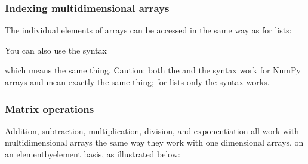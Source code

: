 \documentclass[letterpaper,10pt,english]{sphinxmanual}
\begin{document}
\subsubsection{Indexing multidimensional arrays}
\label{\detokenize{chap3/chap3_arrays:indexing-multidimensional-arrays}}
\sphinxAtStartPar
The individual elements of arrays can be accessed in the same way as for lists:

\begin{sphinxVerbatim}[commandchars=\\\{\}]
\PYG{p}{[}\PYG{p}{]}\PYG{p}{[}\PYG{p}{]}
\end{sphinxVerbatim}

\sphinxAtStartPar
You can also use the syntax

\begin{sphinxVerbatim}[commandchars=\\\{\}]
\PYG{p}{[}\PYG{p}{]}
\end{sphinxVerbatim}

\sphinxAtStartPar
which means the same thing.  Caution: both the  and the  syntax work for NumPy arrays and mean exactly the same thing; for lists only the  syntax works.


\subsubsection{Matrix operations}
\label{\detokenize{chap3/chap3_arrays:matrix-operations}}
\sphinxAtStartPar
Addition, subtraction, multiplication, division, and exponentiation all work with multidimensional arrays the same way they work with one dimensional arrays, on an element\sphinxhyphen{}by\sphinxhyphen{}element basis, as illustrated below:
\end{document}
